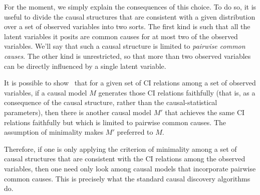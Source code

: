 \documentclass[letterpaper,onecolumn,nofootinbib]{revtex4}
\begin{document}
For the moment, we simply explain the consequences of this choice.  To do so, it is useful to divide the causal structures that are consistent with a given distribution over a set of observed variables into two sorts.  The first kind is such that all the latent variables it posits are common causes for at most two of the observed variables. We'll say that such a causal structure is limited to \emph{pairwise common causes}.  The other kind is unrestricted, so that more than two observed variables can be directly influenced by a single latent variable.

It is possible to show~\cite{Verma1993}  that for a given set of CI relations among a set of observed variables, if a causal model $M$ generates those CI relations faithfully (that is, as a consequence of the causal structure, rather than the causal-statistical parameters), then there is another causal model $M'$ that achieves the same CI relations faithfully but which is limited to pairwise common causes.  The assumption of minimality makes $M'$  preferred to $M$.

Therefore, if one is only applying the criterion of minimality among a set of causal structures that are consistent with the CI relations among the observed variables, then one need only look among causal models that incorporate pairwise common causes.  
This is precisely what the standard causal discovery algorithms do. 
\end{document}
